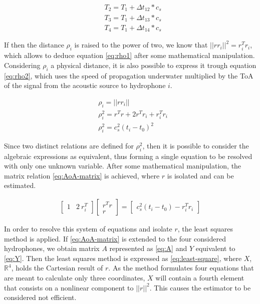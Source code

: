 \begin{eqnarray}
& T_2 = T_1 + \Delta t_{12} * c_s
\label{eq:toa_relation2}\\
& T_3 = T_1 + \Delta t_{13} * c_s
\label{eq:toa_relation3}\\
& T_4 = T_1 + \Delta t_{14} * c_s
\label{eq:toa_relation4}
\end{eqnarray}

If then the distance $\rho_i$ is raised to the power of two, we know that $||rr_i||^2 = r_i^{T}r_i$, which allows to deduce equation \ref{eq:rho1} after some mathematical manipulation. Considering $\rho_i$ a physical distance, it is also possible to express it trough equation \ref{eq:rho2}, which uses the speed of propagation underwater multiplied by the ToA of the signal from the acoustic source to hydrophone $i$.

\begin{eqnarray}
& \rho_i = ||rr_i|| 
\label{eq:rho}\\
&\rho_i^{2} =  r^{T}r + 2r^{T}r_i + r_i^{T}r_i
\label{eq:rho1}\\
&\rho_i^{2} = c_s^{2} (t_i-t_0)^{2}
\label{eq:rho2}
\end{eqnarray}

Since two distinct relations are defined for $\rho_i^{2}$, then it is possible to consider the algebraic expressions as equivalent, thus forming a single equation to be resolved with only one unknown variable. After some mathematical manipulation, the matrix relation \ref{eq:AoA-matrix} is achieved, where $r$ is isolated and can be estimated.

\begin{eqnarray}
\begin{bmatrix}
1 & 2\: r_i^{T}
\end{bmatrix}
\begin{bmatrix}
r^{T} r \\
r
\end{bmatrix}
=  
\begin{bmatrix}
c_s^{2} (t_i-t_0) - r_i^{T} r_i
\end{bmatrix}
\label{eq:AoA-matrix}
\end{eqnarray}
 
In order to resolve this system of equations and isolate $r$, the least squares method is applied. If \ref{eq:AoA-matrix} is extended to the four considered hydrophones, we obtain matrix $A$ represented as \ref{eq:A} and $Y$ equivalent to \ref{eq:Y}. Then the least squares method is expressed as  \ref{eq:least-square}, where $X$, $\mathbb{R}^{4}$, holds the Cartesian result of $r$. As the method formulates four equations that are meant to calculate only three coordinates, $X$ will contain a fourth element that consists on a nonlinear component to $||r||^{2}$. This causes the estimator to be considered not efficient.

